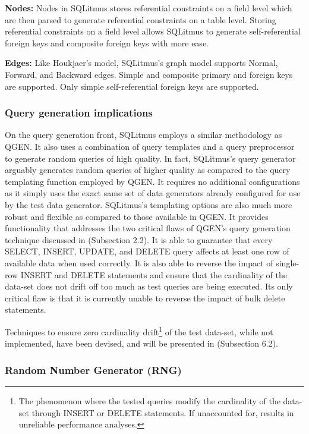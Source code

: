 \documentclass[12pt]{article}
\begin{document}
\begin{spacing}{1.9}
		\textbf{Nodes:} Nodes in SQLitmus stores referential constraints on a field level which are then parsed to generate referential constraints on a table level. Storing referential constraints on a field level allows SQLitmus to generate self-referential foreign keys and composite foreign keys with more ease.
		
		\textbf{Edges:} Like Houkjaer’s model, SQLitmus’s graph model supports Normal, Forward, and Backward edges. Simple and composite primary and foreign keys are supported. Only simple self-referential foreign keys are supported.
		
		
		\subsubsection{Query generation implications}
		On the query generation front, SQLitmus employs a similar methodology as QGEN\cite{Poess:2004}. It also uses a combination of query templates and a query preprocessor to generate random queries of high quality. In fact, SQLitmus’s query generator arguably generates random queries of higher quality as compared to the query templating function employed by QGEN. It requires no additional configurations as it simply uses the exact same set of data generators already configured for use by the test data generator. SQLitmus’s templating options are also much more robust and flexible as compared to those available in QGEN. It provides functionality that addresses the two critical flaws of QGEN’s query generation technique discussed in (Subsection 2.2). It is able to guarantee that every SELECT, INSERT, UPDATE, and DELETE query affects at least one row of available data when used correctly. It is also able to reverse the impact of single-row INSERT and DELETE statements and ensure that the cardinality of the data-set does not drift off too much as test queries are being executed. Its only critical flaw is that it is currently unable to reverse the impact of bulk delete statements.
		
		Techniques to ensure zero cardinality drift\footnote{The phenomenon where the tested queries modify the cardinality of the data-set through INSERT or DELETE statements. If unaccounted for, results in unreliable performance analyses. } of the test data-set, while not implemented, have been devised, and will be presented in (Subsection 6.2).
		
		\subsubsection{Random Number Generator (RNG)}
		

\end{spacing}
\end{document}
